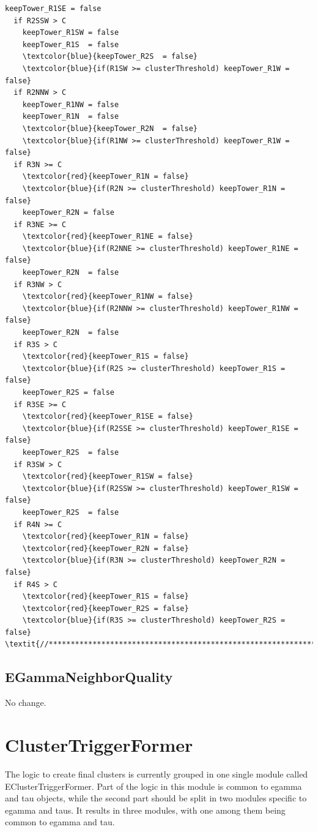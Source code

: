 \documentclass[a4paper, 12pt]{article}
\begin{document}
\begin{Verbatim}[label={Sharing updates}]
    keepTower_R1SE = false
  if R2SSW > C
    keepTower_R1SW = false
    keepTower_R1S  = false
    \textcolor{blue}{keepTower_R2S  = false}
    \textcolor{blue}{if(R1SW >= clusterThreshold) keepTower_R1W = false}
  if R2NNW > C
    keepTower_R1NW = false
    keepTower_R1N  = false
    \textcolor{blue}{keepTower_R2N  = false}
    \textcolor{blue}{if(R1NW >= clusterThreshold) keepTower_R1W = false}
  if R3N >= C
    \textcolor{red}{keepTower_R1N = false}
    \textcolor{blue}{if(R2N >= clusterThreshold) keepTower_R1N = false}
    keepTower_R2N = false
  if R3NE >= C
    \textcolor{red}{keepTower_R1NE = false}
    \textcolor{blue}{if(R2NNE >= clusterThreshold) keepTower_R1NE = false}
    keepTower_R2N  = false
  if R3NW > C
    \textcolor{red}{keepTower_R1NW = false}
    \textcolor{blue}{if(R2NNW >= clusterThreshold) keepTower_R1NW = false}
    keepTower_R2N  = false
  if R3S > C
    \textcolor{red}{keepTower_R1S = false}
    \textcolor{blue}{if(R2S >= clusterThreshold) keepTower_R1S = false}
    keepTower_R2S = false
  if R3SE >= C
    \textcolor{red}{keepTower_R1SE = false}
    \textcolor{blue}{if(R2SSE >= clusterThreshold) keepTower_R1SE = false}
    keepTower_R2S  = false
  if R3SW > C
    \textcolor{red}{keepTower_R1SW = false}
    \textcolor{blue}{if(R2SSW >= clusterThreshold) keepTower_R1SW = false}
    keepTower_R2S  = false
  if R4N >= C
    \textcolor{red}{keepTower_R1N = false}
    \textcolor{red}{keepTower_R2N = false}
    \textcolor{blue}{if(R3N >= clusterThreshold) keepTower_R2N = false}
  if R4S > C
    \textcolor{red}{keepTower_R1S = false}
    \textcolor{red}{keepTower_R2S = false}
    \textcolor{blue}{if(R3S >= clusterThreshold) keepTower_R2S = false}
\textit{//******************************************************************//}
\end{Verbatim}

\subsection{EGammaNeighborQuality}
No change.

\section{ClusterTriggerFormer}
The logic to create final clusters is currently grouped in one single module called EClusterTriggerFormer. Part of the logic in this module is common to egamma and tau objects, while the second part should be split in two modules specific to egamma and taus. It results in three modules, with one among them being common to egamma and tau.
\end{document}
